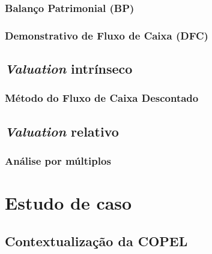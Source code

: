 \documentclass[grad,numbers]{coppe}
\begin{document}
  \hypertarget{balanuxe7o-patrimonial-bp}{%
  \subsection{Balanço Patrimonial (BP)}\label{balanuxe7o-patrimonial-bp}}
  
  \hypertarget{demonstrativo-de-fluxo-de-caixa-dfc}{%
  \subsection{Demonstrativo de Fluxo de Caixa (DFC)}\label{demonstrativo-de-fluxo-de-caixa-dfc}}
  
  \hypertarget{valuation-intruxednseco}{%
  \section{\texorpdfstring{\emph{Valuation} intrínseco}{Valuation intrínseco}}\label{valuation-intruxednseco}}
  
  \hypertarget{muxe9todo-do-fluxo-de-caixa-descontado}{%
  \subsection{Método do Fluxo de Caixa Descontado}\label{muxe9todo-do-fluxo-de-caixa-descontado}}
  
  \hypertarget{valuation-relativo}{%
  \section{\texorpdfstring{\emph{Valuation} relativo}{Valuation relativo}}\label{valuation-relativo}}
  
  \hypertarget{anuxe1lise-por-muxfaltiplos}{%
  \subsection{Análise por múltiplos}\label{anuxe1lise-por-muxfaltiplos}}
  
  \hypertarget{estudo-de-caso}{%
  \chapter{Estudo de caso}\label{estudo-de-caso}}
  
  \hypertarget{contextualizauxe7uxe3o-da-copel}{%
  \section{Contextualização da COPEL}\label{contextualizauxe7uxe3o-da-copel}}
  
\end{document}
